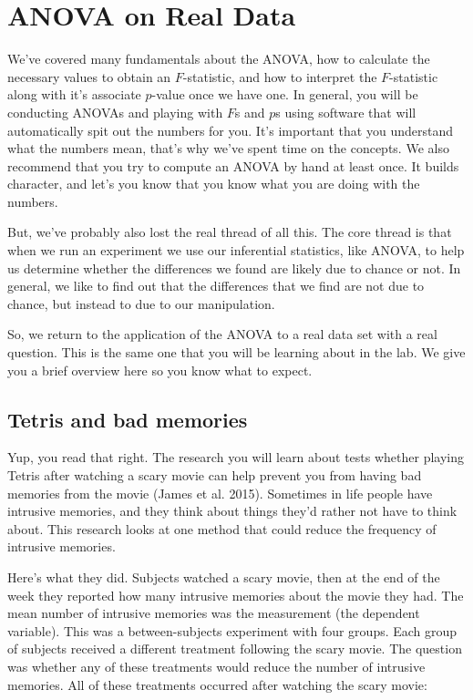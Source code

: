 \documentclass[
  letterpaper,
  DIV=11,
  numbers=noendperiod]{scrreprt}
\begin{document}
\section{ANOVA on Real Data}\label{anova-on-real-data}

We've covered many fundamentals about the ANOVA, how to calculate the
necessary values to obtain an \(F\)-statistic, and how to interpret the
\(F\)-statistic along with it's associate \(p\)-value once we have one.
In general, you will be conducting ANOVAs and playing with \(F\)s and
\(p\)s using software that will automatically spit out the numbers for
you. It's important that you understand what the numbers mean, that's
why we've spent time on the concepts. We also recommend that you try to
compute an ANOVA by hand at least once. It builds character, and let's
you know that you know what you are doing with the numbers.

But, we've probably also lost the real thread of all this. The core
thread is that when we run an experiment we use our inferential
statistics, like ANOVA, to help us determine whether the differences we
found are likely due to chance or not. In general, we like to find out
that the differences that we find are not due to chance, but instead to
due to our manipulation.

So, we return to the application of the ANOVA to a real data set with a
real question. This is the same one that you will be learning about in
the lab. We give you a brief overview here so you know what to expect.

\subsection{Tetris and bad memories}\label{tetris-and-bad-memories}

Yup, you read that right. The research you will learn about tests
whether playing Tetris after watching a scary movie can help prevent you
from having bad memories from the movie (James et al. 2015). Sometimes
in life people have intrusive memories, and they think about things
they'd rather not have to think about. This research looks at one method
that could reduce the frequency of intrusive memories.

Here's what they did. Subjects watched a scary movie, then at the end of
the week they reported how many intrusive memories about the movie they
had. The mean number of intrusive memories was the measurement (the
dependent variable). This was a between-subjects experiment with four
groups. Each group of subjects received a different treatment following
the scary movie. The question was whether any of these treatments would
reduce the number of intrusive memories. All of these treatments
occurred after watching the scary movie:
\end{document}
